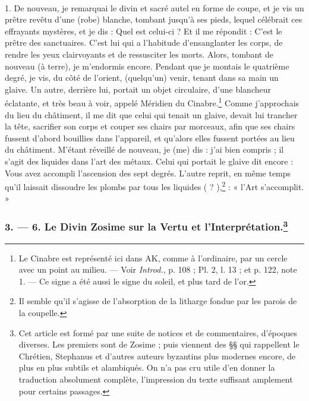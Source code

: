 \documentclass[landscape, a4paper, 11pt, oneside, polutonikogreek, french]{article}
\begin{document}
\paragraph{}
1. De nouveau, je remarquai le divin et sacré autel en forme de coupe, et je vis un prêtre revêtu d'une (robe) blanche, tombant jusqu'à ses pieds, lequel célébrait ces effrayants mystères, et je dis : Quel est celui-ci ? Et il me répondit : C'est le prêtre des sanctuaires. C'est lui qui a l'habitude d'ensanglanter les corps, de rendre les yeux clairvoyants et de ressusciter les morts. Alors, tombant de nouveau (à terre), je m'endormis encore. Pendant que je montais le quatrième degré, je vis, du côté de l'orient, (quelqu'un) venir, tenant dans sa main un glaive. Un autre, derrière lui, portait un objet circulaire, d'une blancheur éclatante, et très beau à voir, appelé Méridien du Cinabre.\footnote{Le Cinabre est représenté ici dans AK, comme à l'ordinaire, par un cercle avec un point au milieu. --- Voir \emph{Introd.}, p. 108 ; Pl. 2, l. 13 ; et p. 122, note 1. --- Ce signe a été aussi le signe du soleil, et plus tard de l'or.} Comme j'approchais du lieu du châtiment, il me dit que celui qui tenait un glaive, devait lui trancher la tête, sacrifier son corps et couper ses chairs par morceaux, afin que ses chairs fussent d'abord bouillies dans l'appareil, et qu'alors elles fussent portées au lieu du châtiment. M'étant réveillé de nouveau, je (me) dis : j'ai bien compris ; il s'agit des liquides dans l'art des métaux. Celui qui portait le glaive dit encore : Vous avez accompli l'ascension des sept degrés. L'autre reprit, en même temps qu'il laissait dissoudre les plombs par tous les liquides ( ? ),\footnote{Il semble qu'il s'agisse de l'absorption de la litharge fondue par les parois de la coupelle.} : « l'Art s'accomplit. »

\bigskip
\centerline{\EightStarTaper}
\centerline{\EightStarTaper\EightStarTaper}
\bigskip

\subsubsection[3. --- 6. Le Divin Zosime sur la Vertu et l'Interprétation.]{3. --- 6. Le Divin Zosime sur la Vertu et l'Interprétation.\footnote{Cet article est formé par une suite de notices et de commentaires, d'époques diverses. Les premiers sont de Zosime ; puis viennent des §§ qui rappellent le Chrétien, Stephanus et d'autres auteurs byzantins plus modernes encore, de plus en plus subtils et alambiqués. On n'a pas cru utile d'en donner la traduction absolument complète, l'impression du texte suffisant amplement pour certains passages.}}
\end{document}
